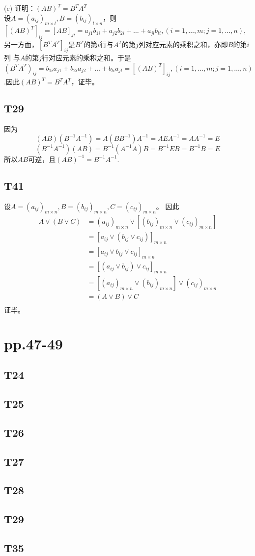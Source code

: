 \documentclass{article}
\begin{document}
(c) 证明：$(AB)^T = B^TA^T$\\
设$A = (a_{ij})_{m\times l}, B = (b_{ij})_{l \times n}$，则$[(AB)^T]_{ij} = [AB]_{ji}
= a_{j1}b_{1i} + a_{j2}b_{2i} + \dots + a_{jl}b_{li},(i = 1, \dots , m; j = 1, \dots , n)$,
另一方面，$[B^TA^T]_{ij}$是$B^T$的第$i$行与$A^T$的第$j$列对应元素的乘积之和，亦即$B$的第$i$列
与$A$的第$j$行对应元素的乘积之和。于是$(B^TA^T)_{ij} = b_{1i}a_{j1} + b_{2i}a_{j2} + \dots +b_{li}a_{jl}
= [(AB)^T]_{ij}, (i = 1, \dots ,m; j = 1, \dots, n)$.因此$(AB)^T = B^TA^T$，证毕。

\subsection{T29}
因为
\[
(AB)(B^{-1}A^{-1}) = A(BB^{-1})A^{-1} = AEA^{-1} = AA^{-1} = E
\]
\[
(B^{-1}A^{-1})(AB) = B^{-1}(A^{-1}A)B = B^{-1}EB = B^{-1}B = E
\]
所以$AB$可逆，且$(AB)^{-1} = B^{-1}A^{-1}$.
\subsection{T41}
设$A = (a_{ij})_{m \times n}, B = (b_{ij})_{m \times n}, C = (c_{ij})_{m \times n}$。
因此
\begin{align*}
    A \lor (B \lor C) &= (a_{ij})_{m \times n} \lor [(b_{ij})_{m \times n} \lor (c_{ij})_{m \times n}]\\
    &= [a_{ij} \lor (b_{ij} \lor c_{ij})]_{m \times n}\\
    &= [a_{ij} \lor b_{ij} \lor c_{ij}]_{m \times n}\\
    &= [(a_{ij} \lor b_{ij}) \lor c_{ij}]_{m \times n}\\
    &= [(a_{ij})_{m \times n} \lor (b_{ij})_{m \times n}] \lor (c_{ij})_{m \times n}\\
    &= (A \lor B) \lor C\\ 
\end{align*}证毕。

\section{pp.47-49}
\subsection{T24}
\subsection{T25}
\subsection{T26}
\subsection{T27}
\subsection{T28}
\subsection{T29}
\subsection{T35}
\end{document}
